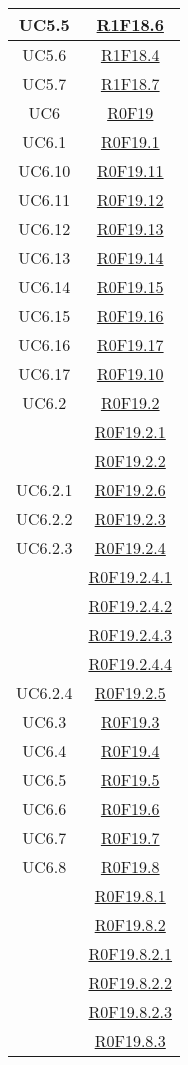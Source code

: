 \documentclass[../AnalisiDeiRequisiti.tex]{subfiles}
\begin{document}
\begin{longtable}{|c|c|}
	UC5.5 & \hyperlink{R1F18.6}{R1F18.6}\\\hline
	UC5.6 & \hyperlink{R1F18.4}{R1F18.4}\\\hline
	UC5.7 & \hyperlink{R1F18.7}{R1F18.7}\\\hline
	UC6 & \hyperlink{R0F19}{R0F19}\\\hline
	UC6.1 & \hyperlink{R0F19.1}{R0F19.1}\\\hline
	UC6.10 & \hyperlink{R0F19.11}{R0F19.11}\\\hline
	UC6.11 & \hyperlink{R0F19.12}{R0F19.12}\\\hline
	UC6.12 & \hyperlink{R0F19.13}{R0F19.13}\\\hline
	UC6.13 & \hyperlink{R0F19.14}{R0F19.14}\\\hline
	UC6.14 & \hyperlink{R0F19.15}{R0F19.15}\\\hline
	UC6.15 & \hyperlink{R0F19.16}{R0F19.16}\\\hline
	UC6.16 & \hyperlink{R0F19.17}{R0F19.17}\\\hline
	UC6.17 & \hyperlink{R0F19.10}{R0F19.10}\\\hline
	UC6.2 & \hyperlink{R0F19.2}{R0F19.2}\\& \hyperlink{R0F19.2.1}{R0F19.2.1}\\& \hyperlink{R0F19.2.2}{R0F19.2.2}\\\hline
	UC6.2.1 & \hyperlink{R0F19.2.6}{R0F19.2.6}\\\hline
	UC6.2.2 & \hyperlink{R0F19.2.3}{R0F19.2.3}\\\hline
	UC6.2.3 & \hyperlink{R0F19.2.4}{R0F19.2.4}\\& \hyperlink{R0F19.2.4.1}{R0F19.2.4.1}\\& \hyperlink{R0F19.2.4.2}{R0F19.2.4.2}\\& \hyperlink{R0F19.2.4.3}{R0F19.2.4.3}\\& \hyperlink{R0F19.2.4.4}{R0F19.2.4.4}\\\hline
	UC6.2.4 & \hyperlink{R0F19.2.5}{R0F19.2.5}\\\hline
	UC6.3 & \hyperlink{R0F19.3}{R0F19.3}\\\hline
	UC6.4 & \hyperlink{R0F19.4}{R0F19.4}\\\hline
	UC6.5 & \hyperlink{R0F19.5}{R0F19.5}\\\hline
	UC6.6 & \hyperlink{R0F19.6}{R0F19.6}\\\hline
	UC6.7 & \hyperlink{R0F19.7}{R0F19.7}\\\hline
	UC6.8 & \hyperlink{R0F19.8}{R0F19.8}\\& \hyperlink{R0F19.8.1}{R0F19.8.1}\\& \hyperlink{R0F19.8.2}{R0F19.8.2}\\& \hyperlink{R0F19.8.2.1}{R0F19.8.2.1}\\& \hyperlink{R0F19.8.2.2}{R0F19.8.2.2}\\& \hyperlink{R0F19.8.2.3}{R0F19.8.2.3}\\& \hyperlink{R0F19.8.3}{R0F19.8.3}\\\hline

\end{longtable}
\end{document}
